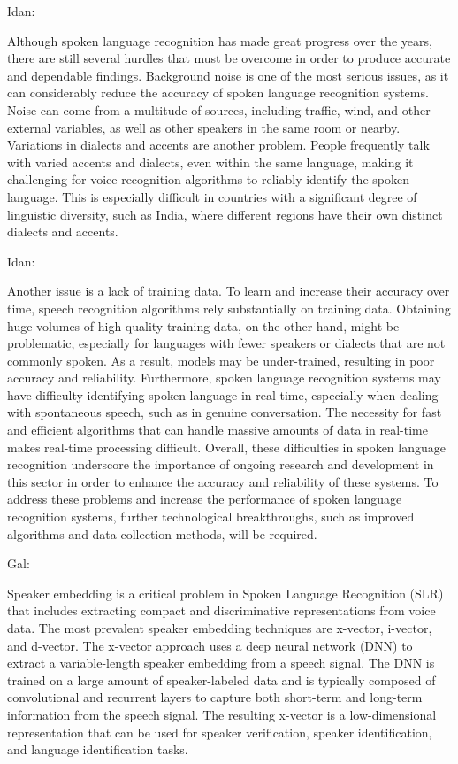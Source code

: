 \documentclass[a4paper]{article}
\begin{document}
Idan:

Although spoken language recognition has made great progress over the years, there are still several hurdles that must be overcome in order to produce accurate and dependable findings. Background noise is one of the most serious issues, as it can considerably reduce the accuracy of spoken language recognition systems. Noise can come from a multitude of sources, including traffic, wind, and other external variables, as well as other speakers in the same room or nearby. Variations in dialects and accents are another problem. People frequently talk with varied accents and dialects, even within the same language, making it challenging for voice recognition algorithms to reliably identify the spoken language. This is especially difficult in countries with a significant degree of linguistic diversity, such as India, where different regions have their own distinct dialects and accents. 

Idan:

Another issue is a lack of training data. To learn and increase their accuracy over time, speech recognition algorithms rely substantially on training data. Obtaining huge volumes of high-quality training data, on the other hand, might be problematic, especially for languages with fewer speakers or dialects that are not commonly spoken. As a result, models may be under-trained, resulting in poor accuracy and reliability. Furthermore, spoken language recognition systems may have difficulty identifying spoken language in real-time, especially when dealing with spontaneous speech, such as in genuine conversation. The necessity for fast and efficient algorithms that can handle massive amounts of data in real-time makes real-time processing difficult. Overall, these difficulties in spoken language recognition underscore the importance of ongoing research and development in this sector in order to enhance the accuracy and reliability of these systems. To address these problems and increase the performance of spoken language recognition systems, further technological breakthroughs, such as improved algorithms and data collection methods, will be required.

Gal:

Speaker embedding is a critical problem in Spoken Language Recognition (SLR) that includes extracting compact and discriminative representations from voice data. The most prevalent speaker embedding techniques are x-vector, i-vector, and d-vector. The x-vector approach uses a deep neural network (DNN) to extract a variable-length speaker embedding from a speech signal. The DNN is trained on a large amount of speaker-labeled data and is typically composed of convolutional and recurrent layers to capture both short-term and long-term information from the speech signal. The resulting x-vector is a low-dimensional representation that can be used for speaker verification, speaker identification, and language identification tasks. 
\end{document}

